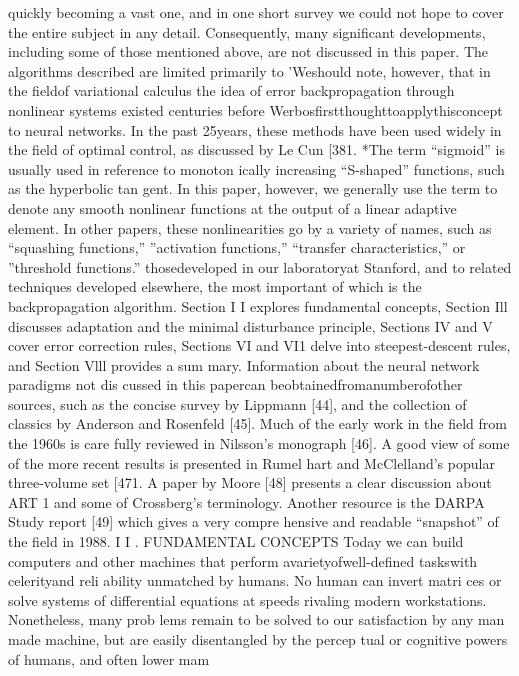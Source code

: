\documentclass[11pt,a4paper,twocolumn]{article}
\begin{document}
quickly becoming a vast one, and in one short survey we 
could not hope to cover the entire subject in any detail. 
Consequently, many significant developments, including 
some of those mentioned above, are not discussed in this 
paper. The algorithms described are limited primarily to 
’Weshould note, however, that in the fieldof variational calculus 
the idea of error backpropagation through nonlinear systems 
existed centuries before Werbosfirstthoughttoapplythisconcept 
to neural networks. In the past 25years, these methods have been 
used widely in the field of optimal control, as discussed by Le Cun 
[381. 
*The term “sigmoid” is usually used in reference to monoton
ically increasing “S-shaped” functions, such as the hyperbolic tan
gent. In this paper, however, we generally use the term to denote 
any smooth nonlinear functions at the output of a linear adaptive 
element. In other papers, these nonlinearities go by a variety of 
names, such as “squashing functions,” ”activation functions,” 
“transfer characteristics,” or ”threshold functions.” 
thosedeveloped in our laboratoryat Stanford, and to related 
techniques developed elsewhere, the most important of 
which is the backpropagation algorithm. Section I I  explores 
fundamental concepts, Section Ill discusses adaptation and 
the minimal disturbance principle, Sections IV and V cover 
error correction rules, Sections VI and VI1 delve into 
steepest-descent rules, and Section Vlll provides a sum
mary. 
Information about the neural network paradigms not dis
cussed in this papercan beobtainedfromanumberofother 
sources, such as the concise survey by Lippmann [44], and 
the collection of classics by Anderson and Rosenfeld [45]. 
Much of the early work in the field from the 1960s is care
fully reviewed in Nilsson’s monograph [46]. A good view 
of some of the more recent results is presented in Rumel
hart and McClelland’s popular three-volume set [471. A 
paper by Moore [48] presents a clear discussion about ART 
1 and some of Crossberg’s terminology. Another resource 
is the DARPA Study report [49] which gives a very compre
hensive and readable “snapshot” of the field in 1988. 
I I .  
FUNDAMENTAL CONCEPTS 
Today we can build computers and other machines that 
perform avarietyofwell-defined taskswith celerityand reli
ability unmatched by humans. No human can invert matri
ces or solve systems of differential equations at speeds 
rivaling modern workstations. Nonetheless, many prob
lems remain to be solved to our satisfaction by any man
made machine, but are easily disentangled by the percep
tual or cognitive powers of humans, and often lower mam
\end{document}
